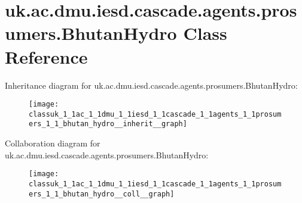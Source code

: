 \hypertarget{classuk_1_1ac_1_1dmu_1_1iesd_1_1cascade_1_1agents_1_1prosumers_1_1_bhutan_hydro}{\section{uk.\-ac.\-dmu.\-iesd.\-cascade.\-agents.\-prosumers.\-Bhutan\-Hydro Class Reference}
\label{classuk_1_1ac_1_1dmu_1_1iesd_1_1cascade_1_1agents_1_1prosumers_1_1_bhutan_hydro}
}


Inheritance diagram for uk.\-ac.\-dmu.\-iesd.\-cascade.\-agents.\-prosumers.\-Bhutan\-Hydro\-:\nopagebreak
\begin{figure}[H]
\begin{center}
\leavevmode
\texttt{[image: classuk\_1\_1ac\_1\_1dmu\_1\_1iesd\_1\_1cascade\_1\_1agents\_1\_1prosumers\_1\_1\_bhutan\_hydro\_\_inherit\_\_graph]}
\end{center}
\end{figure}


Collaboration diagram for uk.\-ac.\-dmu.\-iesd.\-cascade.\-agents.\-prosumers.\-Bhutan\-Hydro\-:\nopagebreak
\begin{figure}[H]
\begin{center}
\leavevmode
\texttt{[image: classuk\_1\_1ac\_1\_1dmu\_1\_1iesd\_1\_1cascade\_1\_1agents\_1\_1prosumers\_1\_1\_bhutan\_hydro\_\_coll\_\_graph]}
\end{center}
\end{figure}
